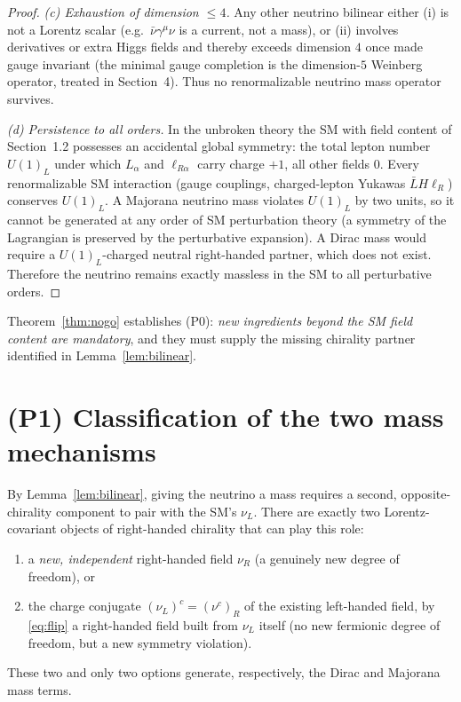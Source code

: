 \documentclass[12pt]{article}
\theoremstyle{definition}
\newcommand{\nuL}{\nu_L}
\newcommand{\nuR}{\nu_R}
\begin{document}
\begin{proof}
\smallskip
\emph{(c) Exhaustion of dimension $\le4$.} Any other neutrino bilinear
either (i) is not a Lorentz scalar (e.g.\ $\bar\nu\gamma^\mu\nu$ is a
current, not a mass), or (ii) involves derivatives or extra Higgs fields
and thereby exceeds dimension $4$ once made gauge invariant (the minimal
gauge completion is the dimension-$5$ Weinberg operator, treated in
Section~4). Thus no renormalizable neutrino mass operator survives.

\smallskip
\emph{(d) Persistence to all orders.} In the unbroken theory the SM with
field content of Section~1.2 possesses an accidental global symmetry: the
total lepton number $U(1)_L$ under which $L_\alpha$ and $\ell_{R\alpha}$
carry charge $+1$, all other fields $0$. Every renormalizable SM
interaction (gauge couplings, charged-lepton Yukawas
$\bar L H \ell_R$) conserves $U(1)_L$. A Majorana neutrino mass violates
$U(1)_L$ by two units, so it cannot be generated at any order of SM
perturbation theory (a symmetry of the Lagrangian is preserved by the
perturbative expansion). A Dirac mass would require a $U(1)_L$-charged
neutral right-handed partner, which does not exist. Therefore the
neutrino remains exactly massless in the SM to all perturbative orders.
\end{proof}

Theorem~\ref{thm:nogo} establishes (P0): \emph{new ingredients beyond the
SM field content are mandatory}, and they must supply the missing
chirality partner identified in Lemma~\ref{lem:bilinear}.

\section{(P1) Classification of the two mass mechanisms}

By Lemma~\ref{lem:bilinear}, giving the neutrino a mass requires a second,
opposite-chirality component to pair with the SM's $\nuL$. There are
exactly two Lorentz-covariant objects of right-handed chirality that can
play this role:
\begin{enumerate}
\item a \emph{new, independent} right-handed field $\nuR$
(a genuinely new degree of freedom), or
\item the charge conjugate $(\nuL)^c=(\nu^c)_R$ of the existing
left-handed field, by \eqref{eq:flip} a right-handed field built from
$\nuL$ itself (no new fermionic degree of freedom, but a new symmetry
violation).
\end{enumerate}
These two and only two options generate, respectively, the Dirac and
Majorana mass terms.
\end{document}
